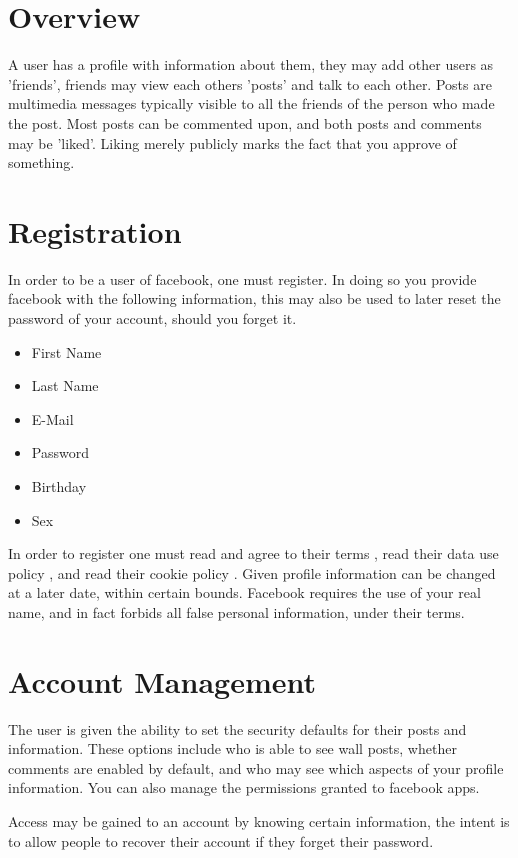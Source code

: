 \section{Overview}
A user has a profile with information about them, they may add other users as
'friends', friends may view each others 'posts' and talk to each other. Posts
are multimedia messages typically visible to all the friends of the person who
made the post. Most posts can be commented upon, and both posts and comments may
be 'liked'. Liking merely publicly marks the fact that you approve of
something.

\section{Registration}
In order to be a user of facebook, one must register. In doing so you provide
facebook with the following information, this may also be used to later reset
the password of your account, should you forget it.

\begin{itemize}
\item First Name
\item Last Name
\item E-Mail
\item Password
\item Birthday
\item Sex
\end{itemize}

In order to register one must read and agree to their terms \cite{fbterms}, read
their data use policy \cite{fbdatause}, and read their cookie policy
\cite{fbcookies}.
Given profile information can be changed at a later date, within certain bounds.
Facebook requires the use of your real name, and in fact forbids all false
personal information, under their terms.\cite[4.1]{fbterms}

\section{Account Management}
The user is given the ability to set the security defaults for their posts and
information. These options include who is able to see wall posts, whether
comments are enabled by default, and who may see which aspects of your profile
information. You can also manage the permissions granted to facebook apps.

Access may be gained to an account by knowing certain information, the intent is
to allow people to recover their account if they forget their password.


